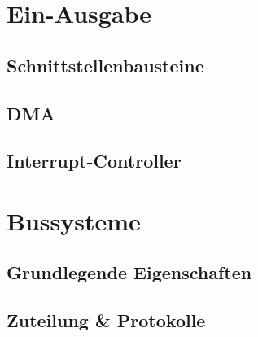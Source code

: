 \documentclass[a4paper]{scrartcl}
\begin{document}
	\section{Ein-Ausgabe}
		\subsection{Schnittstellenbausteine}
		\subsection{DMA}
		\subsection{Interrupt-Controller}
		
	\section{Bussysteme}
		\subsection{Grundlegende Eigenschaften}
		\subsection{Zuteilung \& Protokolle}
		
	
	
	
	
	
	
	
	
	
\end{document}

